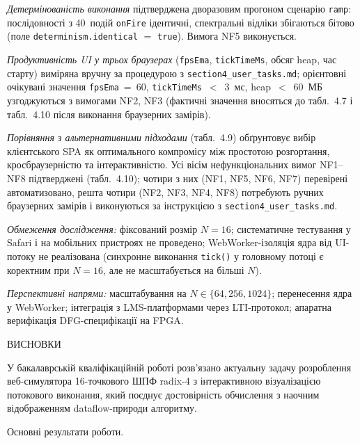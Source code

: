 \documentclass[
]{article}
\begin{document}
\emph{Детермінованість виконання} підтверджена дворазовим прогоном
сценарію \texttt{ramp}: послідовності з 40~подій \texttt{onFire}
ідентичні, спектральні відліки збігаються бітово (поле
\texttt{determinism.identical} \(=\) \texttt{true}). Вимога NF5
виконується.

\emph{Продуктивність UI у трьох браузерах} (\texttt{fpsEma},
\texttt{tickTimeMs}, обсяг heap, час старту) виміряна вручну за
процедурою з \texttt{section4\_user\_tasks.md}; орієнтовні очікувані
значення \texttt{fpsEma}~=~60, \texttt{tickTimeMs}~\(<\)~3~мс,
heap~\(<\)~60~МБ узгоджуються з вимогами NF2, NF3 (фактичні значення
вносяться до табл.~4.7 і табл.~4.10 після виконання браузерних замірів).

\emph{Порівняння з альтернативними підходами} (табл.~4.9) обґрунтовує
вибір клієнтського SPA як оптимального компромісу між простотою
розгортання, кросбраузерністю та інтерактивністю. Усі вісім
нефункціональних вимог NF1--NF8 підтверджені (табл.~4.10); чотири з
них (NF1, NF5, NF6, NF7) перевірені автоматизовано, решта чотири (NF2,
NF3, NF4, NF8) потребують ручних браузерних замірів і виконуються за
інструкцією з \texttt{section4\_user\_tasks.md}.

\emph{Обмеження дослідження:} фіксований розмір \(N = 16\); систематичне
тестування у Safari і на мобільних пристроях не проведено;
WebWorker-ізоляція ядра від UI-потоку не реалізована (синхронне
виконання \texttt{tick()} у головному потоці є коректним при
\(N = 16\), але не масштабується на більші \(N\)).

\emph{Перспективні напрями:} масштабування на \(N \in \{64, 256, 1024\}\);
перенесення ядра у WebWorker; інтеграція з LMS-платформами через
LTI-протокол; апаратна верифікація DFG-специфікації на FPGA.

\protect{}\label{_Toc230379738}{}ВИСНОВКИ

У бакалаврській кваліфікаційній роботі розв'язано актуальну задачу
розроблення веб-симулятора 16-точкового ШПФ radix-4 з інтерактивною
візуалізацією потокового виконання, який поєднує достовірність
обчислення з наочним відображенням dataflow-природи алгоритму.

Основні результати роботи.
\end{document}
